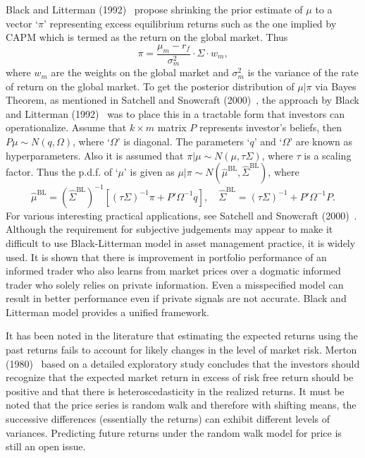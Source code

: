 Black and Litterman (1992)~\cite{blacklit} propose shrinking the prior estimate of $\mu$ to a vector `$\pi$' representing excess equilibrium returns such as the one implied by CAPM which is termed as the return on the global market. Thus
	\begin{equation} \label{eqn:bigpi}
	\pi = \dfrac{\mu_m-r_f}{\sigma_m^2} \cdot \Sigma \cdot w_m,
	\end{equation}
where $w_m$ are the weights on the global market and $\sigma_m^2$ is the variance of the rate of return on the global market. To get the posterior distribution of $\mu \big| \pi$ via Bayes Theorem, as mentioned in Satchell and Snowcraft (2000)~\cite{snow}, the approach by Black and Litterman (1992)~\cite{blacklit}  was to place this in a tractable form that investors can operationalize. Assume that $k \times m$ matrix $P$ represents investor's beliefs, then $P \mu \sim N(q,\Omega)$, where `$\Omega$' is diagonal. The parameters `$q$' and `$\Omega$' are known as hyperparameters. Also it is assumed that $\pi \big| \mu \sim N(\mu,\tau \Sigma)$, where $\tau$ is a scaling factor. Thus the p.d.f. of `$\mu$' is given as $\mu \big| \pi \sim N(\hat{\mu}^{\text{BL}}, \hat{\Sigma}^{\text{BL}})$, where 
	\begin{equation} \label{eqn:bleq}
	\hat{\mu}^{\text{BL}}= (\hat{\Sigma}^{\text{BL}})^{-1} [ (\tau \Sigma)^{-1}\pi + P' \Omega^{-1}q], \quad \hat{\Sigma}^{\text{BL}}= (\tau \Sigma)^{-1} + P' \Omega^{-1}P.
	\end{equation}
For various interesting practical applications, see Satchell and Snowcraft (2000)~\cite{snow}. Although the requirement for subjective judgements may appear to make it difficult to use Black-Litterman model in asset management practice, it is widely used. It is shown that there is improvement in portfolio performance of an informed trader who also learns from market prices over a dogmatic informed trader who solely relies on private information. Even a misspecified model can result in better performance even if private signals are not accurate. Black and Litterman model provides a unified framework.


It has been noted in the literature that estimating the expected returns using the past returns fails to account for likely changes in the level of market risk. Merton (1980)~\cite{merton} based on a detailed exploratory study concludes that the investors should recognize that the expected market return in excess of risk free return should be positive and that there is heteroscedasticity in the realized returns. It must be noted that the price series is random walk and therefore with shifting means, the successive differences (essentially the returns) can exhibit different levels of variances. Predicting future returns under the random walk model for price is still an open issue.


